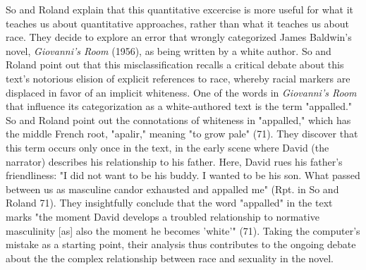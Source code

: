 \documentclass[11pt]{article}
\begin{document}
So and Roland explain that this quantitative excercise is more useful
for what it teaches us about quantitative approaches, rather than what
it teaches us about race. They decide to explore an error that wrongly
categorized James Baldwin's novel, \emph{Giovanni's Room} (1956), as being
written by a white author. So and Roland point out that this
misclassification recalls a critical debate about this text's
notorious elision of explicit references to race, whereby racial
markers are displaced in favor of an implicit whiteness. One of the
words in \emph{Giovanni's Room} that influence its categorization as a
white-authored text is the term "appalled." So and Roland point out
the connotations of whiteness in "appalled," which has the middle
French root, "apalir," meaning "to grow pale" (71). They discover that
this term occurs only once in the text, in the early scene where David
(the narrator) describes his relationship to his father. Here, David
rues his father's friendliness: "I did not want to be his buddy. I
wanted to be his son. What passed between us as masculine candor
exhausted and appalled me" (Rpt. in So and Roland 71). They
insightfully conclude that the word "appalled" in the text marks "the
moment David develops a troubled relationship to normative masculinity
[as] also the moment he becomes 'white'" (71). Taking the computer's
mistake as a starting point, their analysis thus contributes to the
ongoing debate about the the complex relationship between race and
sexuality in the novel.
\end{document}
